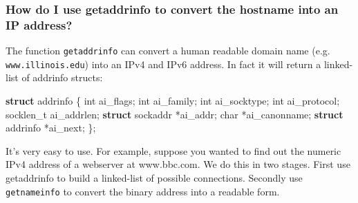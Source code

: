\documentclass[]{article}
\newenvironment{Shaded}{}{}
\newcommand{\KeywordTok}[1]{\textcolor[rgb]{0.00,0.44,0.13}{\textbf{{#1}}}}
\newcommand{\DataTypeTok}[1]{\textcolor[rgb]{0.56,0.13,0.00}{{#1}}}
\newcommand{\NormalTok}[1]{{#1}}
\begin{document}
\subsubsection{How do I use getaddrinfo to convert the hostname into an
IP
address?}\label{how-do-i-use-getaddrinfo-to-convert-the-hostname-into-an-ip-address}

The function \texttt{getaddrinfo} can convert a human readable domain
name (e.g. \texttt{www.illinois.edu}) into an IPv4 and IPv6 address. In
fact it will return a linked-list of addrinfo structs:

\begin{Shaded}
\begin{Highlighting}[]
\KeywordTok{struct} \NormalTok{addrinfo \{}
    \DataTypeTok{int}              \NormalTok{ai_flags;}
    \DataTypeTok{int}              \NormalTok{ai_family;}
    \DataTypeTok{int}              \NormalTok{ai_socktype;}
    \DataTypeTok{int}              \NormalTok{ai_protocol;}
    \NormalTok{socklen_t        ai_addrlen;}
    \KeywordTok{struct} \NormalTok{sockaddr *ai_addr;}
    \DataTypeTok{char}            \NormalTok{*ai_canonname;}
    \KeywordTok{struct} \NormalTok{addrinfo *ai_next;}
\NormalTok{\};}
\end{Highlighting}
\end{Shaded}

It's very easy to use. For example, suppose you wanted to find out the
numeric IPv4 address of a webserver at www.bbc.com. We do this in two
stages. First use getaddrinfo to build a linked-list of possible
connections. Secondly use \texttt{getnameinfo} to convert the binary
address into a readable form.
\end{document}
